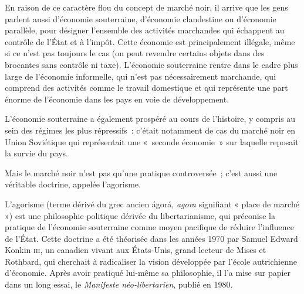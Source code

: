 En raison de ce caractère flou du concept de marché noir, il arrive que les gens parlent aussi d'économie souterraine, d'économie clandestine ou d'économie parallèle, pour désigner l'ensemble des activités marchandes qui échappent au contrôle de l'État et à l'impôt. Cette économie est principalement illégale, même si ce n'est pas toujours le cas (on peut revendre certains objets dans des brocantes sans contrôle ni taxe). L'économie souterraine rentre dans le cadre plus large de l'économie informelle, qui n'est pas nécessairement marchande, qui comprend des activités comme le travail domestique et qui représente une part énorme de l'économie dans les pays en voie de développement.

L'économie souterraine a également prospéré au cours de l'histoire, y compris au sein des régimes les plus répressifs~: c'était notamment de cas du marché noir en Union Soviétique qui représentait une «~seconde économie~» sur laquelle reposait la survie du pays.


Mais le marché noir n'est pas qu'une pratique controversée~; c'est aussi une véritable doctrine, appelée l'agorisme.

L'agorisme (terme dérivé du grec ancien \foreignlanguage{greek}{ágorá}, \emph{agora} signifiant « place de marché ») est une philosophie politique dérivée du libertarianisme, qui préconise la pratique de l'économie souterraine comme moyen pacifique de réduire l'influence de l'État. Cette doctrine a été théorisée dans les années 1970 par Samuel Edward Konkin \textsc{iii}, un canadien vivant aux États-Unis, grand lecteur de Mises et Rothbard, qui cherchait à radicaliser la vision développée par l'école autrichienne d'économie. Après avoir pratiqué lui-même sa philosophie, il l'a mise sur papier dans un long essai, le \emph{Manifeste néo-libertarien}, publié en 1980.

